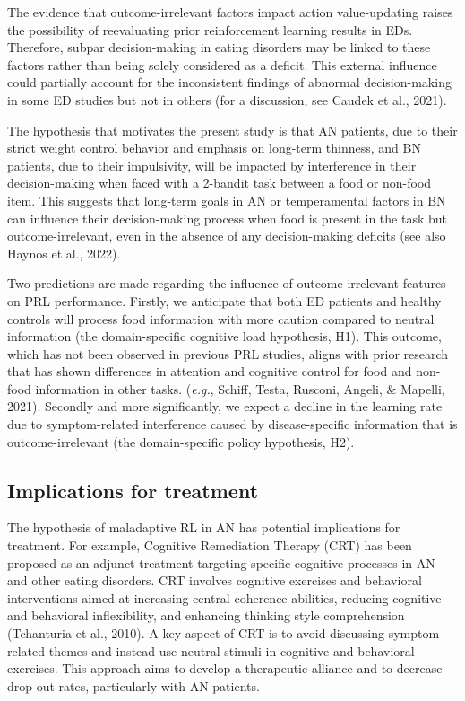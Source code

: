 \documentclass[
  man,floatsintext]{apa6}
\begin{document}
The evidence that outcome-irrelevant factors impact action value-updating raises the possibility of reevaluating prior reinforcement learning results in EDs. Therefore, subpar decision-making in eating disorders may be linked to these factors rather than being solely considered as a deficit. This external influence could partially account for the inconsistent findings of abnormal decision-making in some ED studies but not in others (for a discussion, see Caudek et al., 2021).

The hypothesis that motivates the present study is that AN patients, due to their strict weight control behavior and emphasis on long-term thinness, and BN patients, due to their impulsivity, will be impacted by interference in their decision-making when faced with a 2-bandit task between a food or non-food item. This suggests that long-term goals in AN or temperamental factors in BN can influence their decision-making process when food is present in the task but outcome-irrelevant, even in the absence of any decision-making deficits (see also Haynos et al., 2022).

Two predictions are made regarding the influence of outcome-irrelevant features on PRL performance. Firstly, we anticipate that both ED patients and healthy controls will process food information with more caution compared to neutral information (the domain-specific cognitive load hypothesis, H1). This outcome, which has not been observed in previous PRL studies, aligns with prior research that has shown differences in attention and cognitive control for food and non-food information in other tasks. (\emph{e.g.}, Schiff, Testa, Rusconi, Angeli, \& Mapelli, 2021). Secondly and more significantly, we expect a decline in the learning rate due to symptom-related interference caused by disease-specific information that is outcome-irrelevant (the domain-specific policy hypothesis, H2).

\hypertarget{implications-for-treatment}{%
\subsection{Implications for treatment}\label{implications-for-treatment}}

The hypothesis of maladaptive RL in AN has potential implications for treatment. For example, Cognitive Remediation Therapy (CRT) has been proposed as an adjunct treatment targeting specific cognitive processes in AN and other eating disorders. CRT involves cognitive exercises and behavioral interventions aimed at increasing central coherence abilities, reducing cognitive and behavioral inflexibility, and enhancing thinking style comprehension (Tchanturia et al., 2010). A key aspect of CRT is to avoid discussing symptom-related themes and instead use neutral stimuli in cognitive and behavioral exercises. This approach aims to develop a therapeutic alliance and to decrease drop-out rates, particularly with AN patients.
\end{document}
